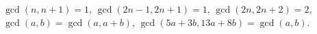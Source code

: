 $\gcd(n, n + 1) = 1$, $\gcd(2n - 1, 2n + 1) = 1$, $\gcd(2n, 2n + 2) = 2$, $\gcd(a, b) = \gcd(a, a + b)$, $\gcd(5a + 3b, 13a + 8b) = \gcd(a, b)$.
